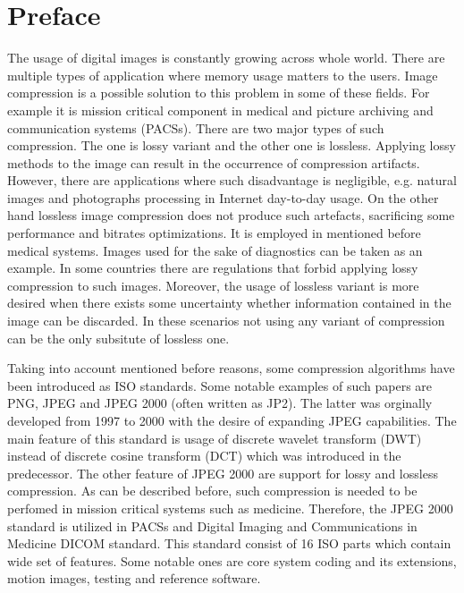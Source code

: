 \section{Preface}

The usage of digital images is constantly growing across whole world. There are multiple types
of application where memory usage matters to the users. Image compression is a possible solution
to this problem in some of these fields. For example it is mission critical component in medical
and picture archiving and communication systems (PACSs). \cite{entropy} There are two major types
of such compression. The one is lossy variant and the other one is lossless. Applying lossy methods
to the image can result in the occurrence of compression artifacts. However, there are applications
where such disadvantage is negligible, e.g. natural images and photographs processing in Internet day-to-day usage.
\cite{img_compress} On the other hand lossless image compression does not produce such artefacts,
sacrificing some performance and bitrates optimizations. It is employed in mentioned before medical systems.
Images used for the sake of diagnostics can be taken as an example. In some countries there are
regulations that forbid applying lossy compression to such images. \cite{entropy} Moreover, the
usage of lossless variant is more desired when there exists some uncertainty whether information
contained in the image can be discarded. In these scenarios not using any variant of compression
can be the only subsitute of lossless one. \cite{entropy}

Taking into account mentioned before reasons, some compression algorithms have been introduced as ISO
standards. \cite{entropy} Some notable examples of such papers are PNG, JPEG and JPEG 2000 (often written as JP2).
The latter was orginally developed from 1997 to 2000 with the desire of expanding JPEG capabilities.
The main feature of this standard is usage of discrete wavelet transform (DWT) instead of discrete
cosine transform (DCT) which was introduced in the predecessor. \cite{jpeg2000} The other feature
of JPEG 2000 are support for lossy and lossless compression. As can be described before, such compression
is needed to be perfomed in mission critical systems such as medicine. Therefore, the JPEG 2000 standard
is utilized in PACSs and Digital Imaging and Communications in Medicine DICOM standard. \cite{entropy}
This standard consist of 16 ISO parts which contain wide set of features. Some notable ones are core system
coding and its extensions, motion images, testing and reference software. \cite{jpeg2000}

